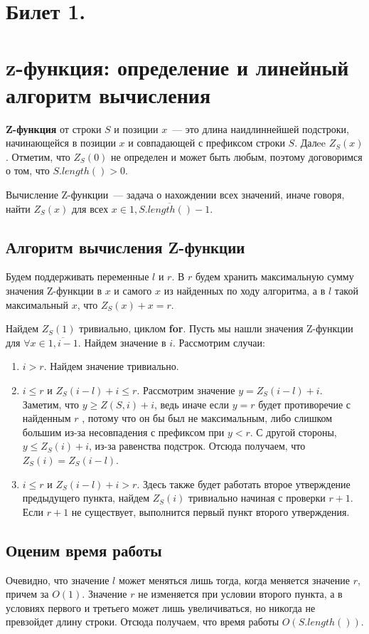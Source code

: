 \section{Билет 1.}
\section*{z-функция: определение и линейный алгоритм вычисления}
\par
\textbf{Z-функция} от строки $S$ и позиции $x$~--- это длина наидлиннейшей подстроки,
начинающейся в позиции $x$ и совпадающей с префиксом строки $S$. Далee $Z_S(x)$.
Отметим, что $Z_S(0)$ не определен и может быть любым, поэтому договоримся о том, что
$S.length() > 0$.

\par
Вычисление Z-функции~--- задача о нахождении всех значений, иначе говоря, найти
$Z_S(x)$ для всех $x \in \overline{1, S.length() - 1}$.

\subsection*{Алгоритм вычисления Z-функции}

Будем поддерживать переменные $l$ и $r$.
В $r$ будем хранить максимальную сумму значения Z-функции в $x$ и самого $x$ из найденных по ходу алгоритма,
а в $l$ такой максимальный $x$, что $Z_S(x) + x = r$.

\par
Найдем $Z_S(1)$ тривиально, циклом \textbf{for}. Пусть мы нашли значения Z-функции
для $\forall x \in \overline{1, i - 1}$. Найдем значение в $i$. Рассмотрим случаи:

\begin{enumerate}
    \item $i > r$.
Найдем значение тривиально.
    \item $i \leq  r$ и $Z_S(i - l) + i \leq r$. Рассмотрим значение $y = Z_S(i - l) + i$.
Заметим, что $y \geq  Z(S, i) + i$, ведь иначе если $y = r$ будет противоречие с найденным $r$ , потому что он бы был не максимальным,
либо слишком большим из-за несовпадения с префиксом при $y < r$. С другой стороны, $y \leq Z_S(i) + i$, из-за равенства подстрок.
Отсюда получаем, что $Z_S(i) = Z_S(i - l)$.
    \item $i \leq r$ и $Z_S(i - l) + i > r$. Здесь также будет работать второе утверждение предыдущего пункта, 
    найдем $Z_S(i)$ тривиально начиная с проверки $r+1$. Если $r+1$ не существует, выполнится первый пункт второго утверждения.
\end{enumerate}

\subsection*{Оценим время работы}
\par
Очевидно, что значение $l$ может меняться лишь тогда, когда меняется значение $r$, причем за $O(1)$.
Значение $r$ не изменяется при условии второго пункта, а в условиях первого и третьего может лишь увеличиваться,
но никогда не превзойдет длину строки. Отсюда получаем, что время работы $O(S.length())$.